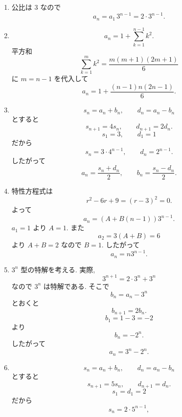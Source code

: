 \begin{enumerate}[label=\textbf{問\arabic*.},leftmargin=3.8em,format=\bookitemlink{practice-basic}{solution}{problem}]
              したがって
          \[
            b_{n+1}
            =\frac{2-a_n}{1-a_n}
            =1+b_n.
          \]
              \(b_1=1\) より \(b_n=n\).
              よって
          \[
            a_n=1-\frac1n.
          \]
        \item 公比は \(3\) なので
          \[
            a_n=a_1\,3^{n-1}
            =2\cdot3^{n-1}.
          \]
        \item \[
            a_n
            =1+\sum_{k=1}^{n-1}k^2.
          \]
              平方和
          \[
            \sum_{k=1}^{m}k^2
            =\frac{m(m+1)(2m+1)}6
          \]
              に \(m=n-1\) を代入して
          \[
            a_n
            =1+\frac{(n-1)n(2n-1)}6.
          \]
        \item \[
            s_n=a_n+b_n,\qquad d_n=a_n-b_n
          \]
              とすると
          \[
            s_{n+1}=4s_n,
            \qquad
            d_{n+1}=2d_n.
          \]
          \[
            s_1=3,\qquad d_1=1
          \]
              だから
          \[
            s_n=3\cdot4^{n-1},
            \qquad
            d_n=2^{n-1}.
          \]
              したがって
          \[
            a_n=\frac{s_n+d_n}{2},
            \qquad
            b_n=\frac{s_n-d_n}{2}.
          \]
        \item 特性方程式は
          \[
            r^2-6r+9=(r-3)^2=0.
          \]
              よって
          \[
            a_n=(A+B(n-1))3^{n-1}.
          \]
              \(a_1=1\) より \(A=1\).
              また
          \[
            a_2=3(A+B)=6
          \]
              より \(A+B=2\) なので \(B=1\).
              したがって
          \[
            a_n=n3^{n-1}.
          \]
        \item \(3^n\) 型の特解を考える.
              実際,
          \[
            3^{n+1}=2\cdot3^n+3^n
          \]
              なので \(3^n\) は特解である.
              そこで
          \[
            b_n=a_n-3^n
          \]
              とおくと
          \[
            b_{n+1}=2b_n.
          \]
          \[
            b_1=1-3=-2
          \]
              より
          \[
            b_n=-2^n.
          \]
              したがって
          \[
            a_n=3^n-2^n.
          \]
        \item \[
            s_n=a_n+b_n,\qquad d_n=a_n-b_n
          \]
              とすると
          \[
            s_{n+1}=5s_n,
            \qquad
            d_{n+1}=d_n.
          \]
          \[
            s_1=d_1=2
          \]
              だから
          \[
            s_n=2\cdot5^{n-1},
\]
\end{enumerate}
